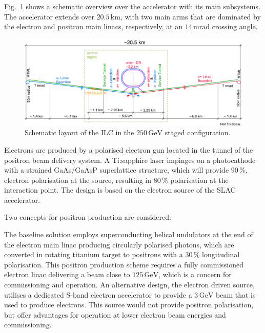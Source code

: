 \documentclass[%
 reprint,
 amsmath,amssymb,
 aps,
]{revtex4-1}
\def\Fig#1{Fig.~\ref{#1}}
\begin{document}
\Fig{fig_ilc-schematic} shows a schematic overview over the accelerator with its main subsystems.
The accelerator extends over $20.5\,{\mathrm{km}}$, with two main arms that are dominated by the electron and positron main linacs, respectively, at an $14\,{\mathrm{mrad}}$ crossing angle.

 \begin{figure}[tb]
 \begin{center}
 \includegraphics[width=\hsize]{figures/TDR-machine-layout-cartoon-staged.pdf}
\caption{Schematic layout of the ILC in the $250\,{\mathrm{GeV}}$ staged configuration.
\label{fig_ilc-schematic}}
 \end{center}
 \end{figure}

Electrons are produced by a polarised electron gun located in the tunnel of the positron beam delivery system. A Ti:sapphire laser impinges on a photocathode with a strained GaAs/GaAsP superlattice structure, which will provide  $90\,\%$, electron polarisation at the source, resulting in $80\,\%$ polarisation at the interaction point. The design is based on the electron source of the SLAC accelerator. 

Two concepts for positron production are considered:

The baseline solution employs superconducting helical undulators at the end of the electron main linac producing circularly polarised photons, which are converted in rotating titanium target to  positrons with a $30\,\%$ longitudinal polarisation.
This positron production scheme requires a fully commissioned electron linac delivering a beam close to $125\,{\mathrm{GeV}}$, which is a concern for commissioning and operation. 
An alternative design, the electron driven source, utilises a dedicated S-band electron accelerator to provide a $3\,{\mathrm{GeV}}$ beam that is used to produce electrons.
This source would not provide positron polarisation,
but offer advantages for operation at lower electron beam energies and commissioning.
\end{document}

